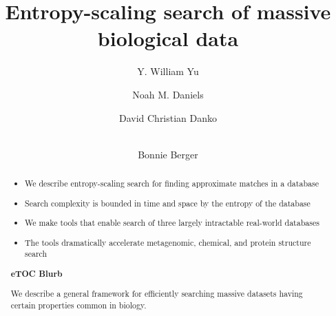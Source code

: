 \documentclass[review,preprint,12pt]{elsarticle}
\theoremstyle{definition}
\theoremstyle{remark}
\numberwithin{equation}{section}
\begin{document}
\begin{frontmatter}

\title{ %
Entropy-scaling search of massive biological data}

\author[mitmath,mitcsail]{Y. William Yu}
\author[mitmath,mitcsail]{Noah M. Daniels}
\author[mitcsail]{David Christian Danko}
\author[mitmath,mitcsail]{\\Bonnie Berger}
\address[mitmath]{Department of Mathematics, Massachusetts Institute of Technology, Cambridge, Massachusetts 02139}
\address[mitcsail]{Computer Science and AI Lab, Massachusetts Institute of Technology, Cambridge, Massachusetts 02139}






\begin{abstract}
    \begin{itemize}
        \item We describe entropy-scaling search for finding approximate matches in a database
        \item Search complexity is bounded in time and space by the entropy of the database
        \item We make tools that enable search of three largely intractable real-world databases
        \item The tools dramatically accelerate metagenomic, chemical, and protein structure search
    \end{itemize}
\noindent\unskip\textbf{eTOC Blurb}
\par\medskip\noindent\unskip\ignorespaces
We describe a general
framework for efficiently searching
massive datasets having certain
properties common in biology.
\end{abstract}

\end{frontmatter}
\end{document}
